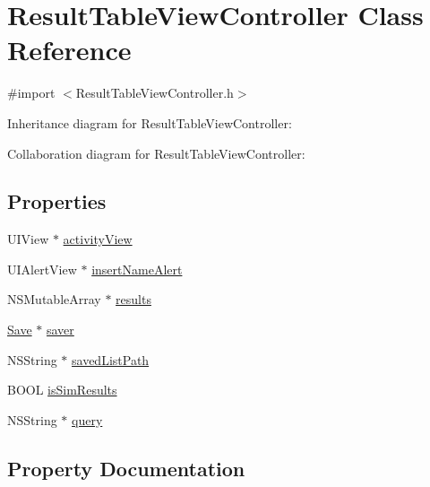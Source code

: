 \hypertarget{interface_result_table_view_controller}{}\section{Result\+Table\+View\+Controller Class Reference}
\label{interface_result_table_view_controller}


{\ttfamily \#import $<$Result\+Table\+View\+Controller.\+h$>$}



Inheritance diagram for Result\+Table\+View\+Controller\+:


Collaboration diagram for Result\+Table\+View\+Controller\+:
\subsection*{Properties}
\begin{DoxyCompactItemize}
\item 
U\+I\+View $\ast$ \hyperlink{interface_result_table_view_controller_a12b9e07c3d6de0154e485752f1779f84}{activity\+View}
\item 
U\+I\+Alert\+View $\ast$ \hyperlink{interface_result_table_view_controller_ab06cf17fb0348c3cc4d8e268a5667c01}{insert\+Name\+Alert}
\item 
N\+S\+Mutable\+Array $\ast$ \hyperlink{interface_result_table_view_controller_aac9b268204aac1044dc8e7dbe2927409}{results}
\item 
\hyperlink{interface_save}{Save} $\ast$ \hyperlink{interface_result_table_view_controller_af56b1c31e591ad111fa3558a48e3fe6e}{saver}
\item 
N\+S\+String $\ast$ \hyperlink{interface_result_table_view_controller_a3bc64243af0d4d0b1ac9e4b4ce219a97}{saved\+List\+Path}
\item 
B\+O\+O\+L \hyperlink{interface_result_table_view_controller_ab58149d144b5844f39ce667aa900268f}{is\+Sim\+Results}
\item 
N\+S\+String $\ast$ \hyperlink{interface_result_table_view_controller_a05210302a3f2f54ca86edab3bdfb8d36}{query}
\end{DoxyCompactItemize}


\subsection{Property Documentation}
\hypertarget{interface_result_table_view_controller_a12b9e07c3d6de0154e485752f1779f84}{}

